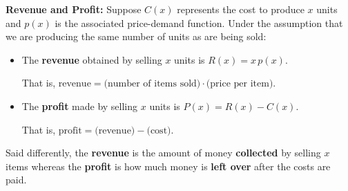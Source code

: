 \documentclass{ximera}
\begin{document}
\colorbox{ResultColor}{\bbm

\begin{defn}  \textbf{Revenue and Profit:}  Suppose $C(x)$ represents the cost to produce $x$ units and $p(x)$ is the associated price-demand function.  Under the assumption that we are producing the same number of units as are being sold: \label{revenueprofitdefns}   

\begin{itemize}

\item The  \textbf{revenue} obtained by selling $x$ units is $R(x) = x \, p(x)$.

That is, $\text{revenue} = \text{(number of items sold)} \cdot \text{(price per item)}.$

\item The  \textbf{profit} made by selling $x$ units is $P(x) = R(x) - C(x)$.

That is, $\text{profit} = \text{(revenue)}  - \text{(cost)}.$

\end{itemize}

\end{defn}

\ebm}

\medskip

Said differently, the \textbf{revenue} is the amount of money \textbf{collected} by selling $x$ items whereas the \textbf{profit} is how much money is \textbf{left over} after the costs are paid.
 
\end{document}
